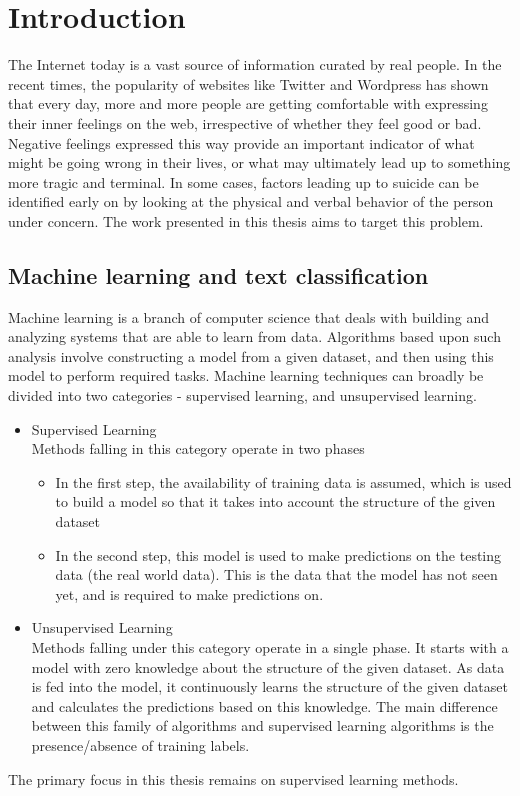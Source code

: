 \chapter{Introduction}
\label{chapter:Introduction}

The Internet today is a vast source of information curated by real people. In the recent times, the popularity of websites like Twitter and Wordpress has shown that every day, more and more people are getting comfortable with expressing their inner feelings on the web, irrespective of whether they feel good or bad. Negative feelings expressed this way provide an important indicator of what might be going wrong in their lives, or what may ultimately lead up to something more tragic and terminal. In some cases, factors leading up to suicide can be identified early on by looking at the physical and verbal behavior of the person under concern. The work presented in this thesis aims to target this problem.

\section{Machine learning and text classification}
Machine learning is a branch of computer science that deals with building and analyzing systems that are able to learn from data. Algorithms based upon such analysis involve constructing a model from a given dataset, and then using this model to perform required tasks. Machine learning techniques can broadly be divided into two categories - supervised learning, and unsupervised learning.
\begin{itemize}
    \item{
    Supervised Learning\\
    Methods falling in this category operate in two phases
    \begin{itemize}
        \item{In the first step, the availability of training data is assumed, which is used to build a model so that it takes into account the structure of the given dataset}
        \item{In the second step, this model is used to make predictions on the testing data (the real world data). This is the data that the model has not seen yet, and is required to make predictions on.}
    \end{itemize}
    }
    \item{
    Unsupervised Learning\\
    Methods falling under this category operate in a single phase. It starts with a model with zero knowledge about the structure of the given dataset. As data is fed into the model, it continuously learns the structure of the given dataset and calculates the predictions based on this knowledge. The main difference between this family of algorithms and supervised learning algorithms is the presence/absence of training labels.
    }
\end{itemize}
The primary focus in this thesis remains on supervised learning methods.

